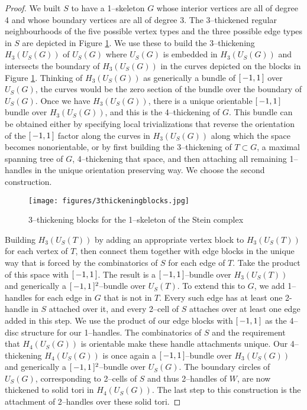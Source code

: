 \begin{proof}
	We built $S$ to have a 1--skeleton $G$ whose interior vertices are all of degree 4 and whose boundary vertices are all of degree 3.
	The 3--thickened regular neighbourhoods of the five possible vertex types and the three possible edge types in $S$ are depicted in Figure \ref{fig:3thickeningblocks}.
	We use these to build the 3--thickening $H_3(U_S(G))$ of $U_S(G)$ where $U_S(G)$ is embedded in $H_3(U_S(G))$ and intersects the boundary of $H_3(U_S(G))$ in the curves depicted on the blocks in Figure \ref{fig:3thickeningblocks}.
	Thinking of $H_3(U_S(G))$ as generically a bundle of $[\,-1,1\,]$ over $U_S(G)$, the curves would be the zero section of the bundle over the boundary of $U_S(G)$.
	Once we have $H_3(U_S(G))$, there is a unique orientable $[\,-1,1\,]$ bundle over $H_3(U_S(G))$, and this is the 4--thickening of $G$.
	This bundle can be obtained either by specifying local trivializations that reverse the orientation of the $[\,-1,1\,]$ factor along the curves in $H_3(U_S(G))$ along which the space becomes nonorientable, or by first building the 3--thickening of $T\subset G$, a maximal spanning tree of $G$, 4--thickening that space, and then attaching all remaining 1--handles in the unique orientation preserving way.
	We choose the second construction.
	
	\begin{figure}
		\centering
		\captionsetup{justification=centering}
		\caption{3--thickening blocks for the 1--skeleton of the Stein complex}
		\texttt{[image: figures/3thickeningblocks.jpg]}
		\label{fig:3thickeningblocks}
	\end{figure}
	
	Building $H_3(U_S(T))$ by adding an appropriate vertex block to $H_3(U_S(T))$ for each vertex of $T$, then connect them together with edge blocks in the unique way that is forced by the combinatorics of $S$ for each edge of $T$.
	Take the product of this space with $[\,-1,1\,]$.
	The result is a $[\,-1,1\,]$--bundle over $H_3(U_S(T))$ and generically a $[\,-1,1\,]^2$--bundle over $U_S(T)$.
	To extend this to $G$, we add 1--handles for each edge in $G$ that is not in $T$.
	Every such edge has at least one 2-handle in $S$ attached over it, and every 2--cell of $S$ attaches over at least one edge added in this step.
	We use the product of our edge blocks with $[\,-1,1\,]$ as the 4--disc structure for our 1--handles.
	The combinatorics of $S$ and the requirement that $H_4(U_S(G))$ is orientable make these handle attachments unique.
	Our 4--thickening $H_4(U_S(G))$ is once again a $[\,-1,1\,]$--bundle over $H_3(U_S(G))$ and generically a $[\,-1,1\,]^2$--bundle over $U_S(G)$.
	The boundary circles of $U_S(G)$, corresponding to 2--cells of $S$ and thus 2--handles of $W$, are now thickened to solid tori in $H_4(U_S(G))$.
	The last step to this construction is the attachment of 2--handles over these solid tori. 
	

\end{proof}
